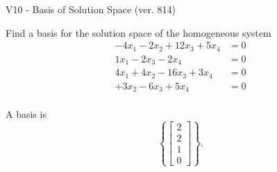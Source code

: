 \begin{exercise}
  \begin{exerciseTitle}V10 - Basis of Solution Space (ver. 814)\end{exerciseTitle}
  \begin{exerciseStatement}
    Find a basis for the solution space of the homogeneous system 
\begin{align*}
 -4 x_ 1 -2 x_ 2 + 12 x_ 3 + 5 x_ 4 &= 0  \\ 
  1 x_ 1 -2 x_ 3 -2 x_ 4 &= 0  \\ 
  4 x_ 1 + 4 x_ 2 -16 x_ 3 + 3 x_ 4 &= 0  \\ 
  + 3 x_ 2 -6 x_ 3 + 5 x_ 4 &= 0  \\ 
 \end{align*}


 
  \end{exerciseStatement}

  \begin{exerciseAnswer}
   A basis is   
\[\left\{\left[\begin{array}{c}
2 \\
2 \\
1 \\
0
\end{array}\right]\right\}.\]

  


  \end{exerciseAnswer}
\end{exercise}